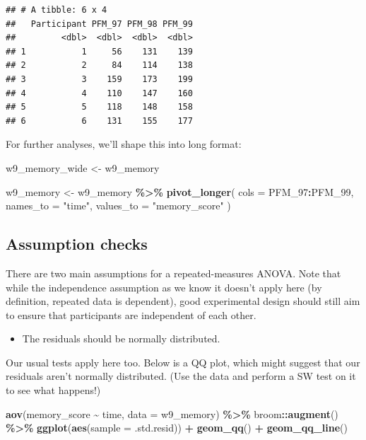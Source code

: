 \documentclass[
]{book}
\newenvironment{Shaded}{\begin{snugshade}}{\end{snugshade}}
\newcommand{\AttributeTok}[1]{\textcolor[rgb]{0.13,0.29,0.53}{#1}}
\newcommand{\FunctionTok}[1]{\textcolor[rgb]{0.13,0.29,0.53}{\textbf{#1}}}
\newcommand{\NormalTok}[1]{#1}
\newcommand{\OtherTok}[1]{\textcolor[rgb]{0.56,0.35,0.01}{#1}}
\newcommand{\SpecialCharTok}[1]{\textcolor[rgb]{0.81,0.36,0.00}{\textbf{#1}}}
\newcommand{\StringTok}[1]{\textcolor[rgb]{0.31,0.60,0.02}{#1}}
\providecommand{\tightlist}{%
  \setlength{\itemsep}{0pt}\setlength{\parskip}{0pt}}
\begin{document}
\begin{verbatim}
## # A tibble: 6 x 4
##   Participant PFM_97 PFM_98 PFM_99
##         <dbl>  <dbl>  <dbl>  <dbl>
## 1           1     56    131    139
## 2           2     84    114    138
## 3           3    159    173    199
## 4           4    110    147    160
## 5           5    118    148    158
## 6           6    131    155    177
\end{verbatim}

For further analyses, we'll shape this into long format:

\begin{Shaded}
\begin{Highlighting}[]
\NormalTok{w9\_memory\_wide }\OtherTok{\textless{}{-}}\NormalTok{ w9\_memory}

\NormalTok{w9\_memory }\OtherTok{\textless{}{-}}\NormalTok{ w9\_memory }\SpecialCharTok{\%\textgreater{}\%}
  \FunctionTok{pivot\_longer}\NormalTok{(}
    \AttributeTok{cols =}\NormalTok{ PFM\_97}\SpecialCharTok{:}\NormalTok{PFM\_99,}
    \AttributeTok{names\_to =} \StringTok{"time"}\NormalTok{,}
    \AttributeTok{values\_to =} \StringTok{"memory\_score"}
\NormalTok{  )}
\end{Highlighting}
\end{Shaded}

\subsection{Assumption checks}\label{assumption-checks-4}

There are two main assumptions for a repeated-measures ANOVA. Note that while the independence assumption as we know it doesn't apply here (by definition, repeated data is dependent), good experimental design should still aim to ensure that participants are independent of each other.

\begin{itemize}
\tightlist
\item
  The residuals should be normally distributed.
\end{itemize}

Our usual tests apply here too. Below is a QQ plot, which might suggest that our residuals aren't normally distributed. (Use the data and perform a SW test on it to see what happens!)

\begin{Shaded}
\begin{Highlighting}[]
\FunctionTok{aov}\NormalTok{(memory\_score }\SpecialCharTok{\textasciitilde{}}\NormalTok{ time, }\AttributeTok{data =}\NormalTok{ w9\_memory) }\SpecialCharTok{\%\textgreater{}\%}
\NormalTok{  broom}\SpecialCharTok{::}\FunctionTok{augment}\NormalTok{() }\SpecialCharTok{\%\textgreater{}\%}
  \FunctionTok{ggplot}\NormalTok{(}\FunctionTok{aes}\NormalTok{(}\AttributeTok{sample =}\NormalTok{ .std.resid)) }\SpecialCharTok{+}
  \FunctionTok{geom\_qq}\NormalTok{() }\SpecialCharTok{+}
  \FunctionTok{geom\_qq\_line}\NormalTok{()}
\end{Highlighting}
\end{Shaded}
\end{document}
